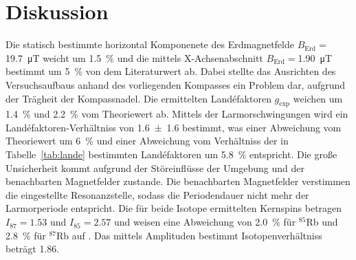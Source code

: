\section{Diskussion}%
\label{sec:diskussion}
Die statisch bestimmte horizontal Komponenete des Erdmagnetfelde
$B_\text{Erd}=$\SI{19.7}{\micro\tesla} weicht um
\SI{1.5}{\percent} und die mittels X-Achsenabschnitt $B_\text{Erd}=$\SI{1.90}{\micro\tesla} bestimmt um
\SI{5}{\percent} von dem Literaturwert ab.
Dabei stellte das Ausrichten des Versuchsaufbaus anhand des vorliegenden
Kompasses ein Problem dar, aufgrund der Trägheit der Kompassnadel.
Die ermittelten Land\'efaktoren $g_\text{exp}$ weichen um \SI{1.4}{\percent}
und \SI{2.2}{\percent} vom Theoriewert ab.
Mittels der Larmorschwingungen wird ein Land\'efaktoren-Verhältniss von \num{1.6 +- 1.6}
bestimmt, was einer Abweichung vom Theoriewert um \SI{6}{\percent} und einer
Abweichung vom Verhältniss der in Tabelle~\ref{tab:lande} bestimmten
Land\'efaktoren um \SI{5.8}{\percent} entspricht.
Die große Unsicherheit kommt aufgrund der Störeinflüsse der Umgebung und der
benachbarten Magnetfelder zustande.
Die benachbarten Magnetfelder verstimmen die eingestellte Resonanzstelle,
sodass die Periodendauer nicht mehr der Larmorperiode entspricht.
Die für beide Isotope ermittelten Kernspins betragen $I_{87}=\num{1.53}$ und
$I_{85}=\num{2.57}$ und weisen eine Abweichung von
\SI{2.0}{\percent} für $^{85}$Rb und \SI{2.8}{\percent} für 
$^{87}$Rb auf \cite{rubidium}.
Das mittels Amplituden bestimmt Isotopenverhältniss beträgt \num{1.86}. 
